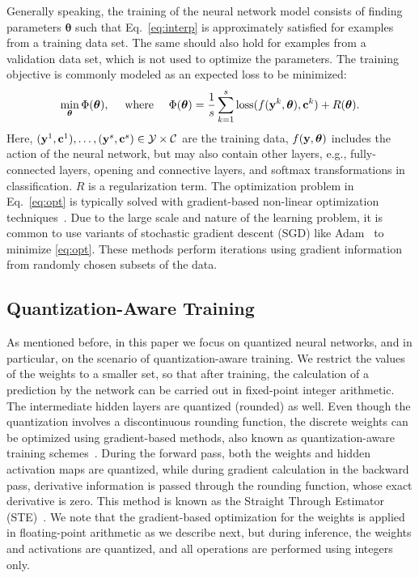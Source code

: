 \documentclass[reqno]{amsart}
\newcommand{\bfc}{{\bf c}}
\newcommand{\bfy}{ {\bf y}}
\newcommand{\bftheta}{{\boldsymbol{\theta}}}
\begin{document}
Generally speaking, the training of the neural network model consists of finding parameters $\bftheta$ such that Eq.~\eqref{eq:interp} is approximately satisfied for examples from a training data set. The same should also hold for examples from a validation data set, which is not used to optimize the parameters.
The training objective is commonly modeled as an expected loss to be minimized: 
\begin{equation}
\label{eq:opt}
    \min_{\bftheta}  \Phi(\bftheta), \quad \text{ where } \quad \Phi(\bftheta) =  \frac1s \sum_{k=1}^s {\rm loss}(f(\bfy^k,\bftheta), \bfc^k) + R (\bftheta).
\end{equation}
Here, $(\bfy^1,\bfc^1), \ldots, (\bfy^s,\bfc^s) \in \mathcal{Y}\times\mathcal{C}$ are the training data, $f(\bfy,\bftheta)$ includes the action of the neural network, but may also contain other layers, e.g., fully-connected layers, opening and connective layers, and softmax transformations in classification. $R$ is a regularization term.
The optimization problem in Eq.~\eqref{eq:opt} is typically solved with gradient-based non-linear optimization techniques~\cite{bottou2018optimization}. Due to the large scale and nature of the learning problem, it is common to use variants of stochastic gradient descent (SGD) like Adam~\cite{kingma2014adam} to minimize \eqref{eq:opt}.
These methods perform iterations using gradient information from randomly chosen subsets of the data.

\subsection{\textbf{Quantization-Aware Training}}
\label{sub:background_quant}
As mentioned before, in this paper we focus on quantized neural networks, and in particular, on the scenario of quantization-aware training. We restrict the values of the weights to a smaller set, so that after training, the calculation of a prediction by the network can be carried out in fixed-point integer arithmetic. The intermediate hidden layers are quantized (rounded) as well. Even though the quantization involves a discontinuous rounding function, the discrete weights can be optimized using gradient-based methods, also known as quantization-aware training schemes~\cite{han2016deep,yin2019blended}. During the forward pass, both the weights and hidden activation maps are quantized, while during gradient calculation in the backward pass, derivative information is passed through the rounding function, whose exact derivative is zero. This method is known as the Straight Through Estimator (STE)~\cite{yoshuabengio2013}. We note that the gradient-based optimization for the weights is applied in floating-point arithmetic as we describe next, but during inference, the weights and activations are quantized, and all operations are performed using integers only.
\end{document}
